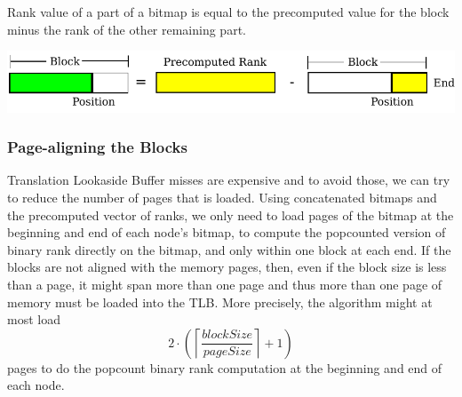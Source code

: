 \figureBegin
\caption{Rank value of a part of a bitmap is equal to the precomputed value for the block minus the rank of the other remaining part.}
\label{fig:PrecomputePopcountBlock}
\includegraphics[width=\textwidth]{PrecomputePopcountBlock.pdf}
\figureEnd








\subsubsection{Page-aligning the Blocks}
Translation Lookaside Buffer misses are expensive and to avoid those, we can try to reduce the number of pages that is loaded.
Using concatenated bitmaps and the precomputed vector of ranks, we only need to load pages of the bitmap at the beginning and end of each node's bitmap, to compute the popcounted version of binary rank directly on the bitmap, and only within one block at each end.
If the blocks are not aligned with the memory pages, then, even if the block size is less than a page, it might span more than one page and thus more than one page of memory must be loaded into the TLB.
More precisely, the algorithm might at most load \[2 \cdot \left( \left\lceil\frac{\mathit{blockSize}}{\mathit{pageSize}}\right\rceil +1 \right)\] pages to do the popcount binary rank computation at the beginning and end of each node.

